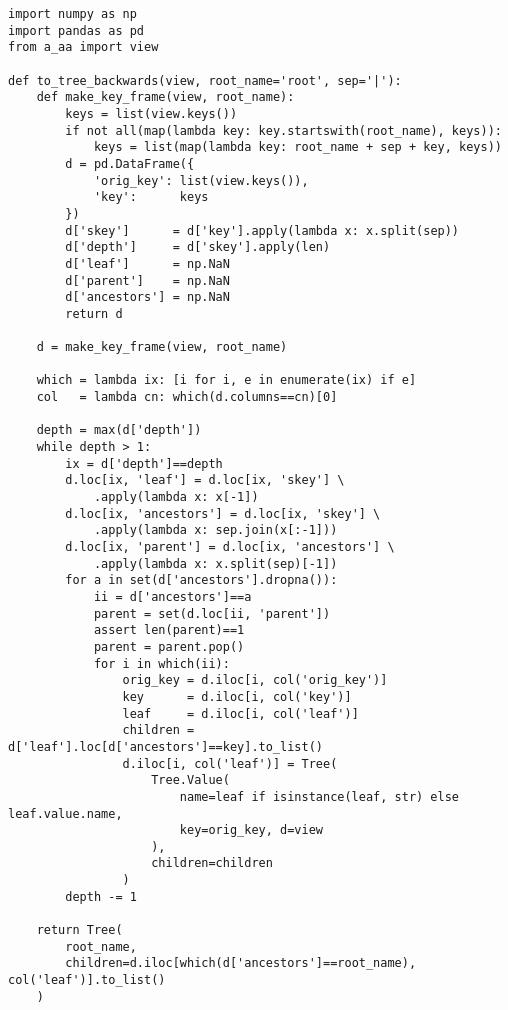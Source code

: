 \documentclass[10pt]{amsart}
\numberwithin{equation}{section}
\begin{document}
\begin{verbatim}
import numpy as np
import pandas as pd
from a_aa import view

def to_tree_backwards(view, root_name='root', sep='|'):
    def make_key_frame(view, root_name):
        keys = list(view.keys())
        if not all(map(lambda key: key.startswith(root_name), keys)):
            keys = list(map(lambda key: root_name + sep + key, keys))
        d = pd.DataFrame({
            'orig_key': list(view.keys()),
            'key':      keys
        })
        d['skey']      = d['key'].apply(lambda x: x.split(sep))
        d['depth']     = d['skey'].apply(len)
        d['leaf']      = np.NaN
        d['parent']    = np.NaN
        d['ancestors'] = np.NaN
        return d

    d = make_key_frame(view, root_name)

    which = lambda ix: [i for i, e in enumerate(ix) if e]
    col   = lambda cn: which(d.columns==cn)[0]

    depth = max(d['depth'])
    while depth > 1:
        ix = d['depth']==depth
        d.loc[ix, 'leaf'] = d.loc[ix, 'skey'] \
            .apply(lambda x: x[-1])
        d.loc[ix, 'ancestors'] = d.loc[ix, 'skey'] \
            .apply(lambda x: sep.join(x[:-1]))
        d.loc[ix, 'parent'] = d.loc[ix, 'ancestors'] \
            .apply(lambda x: x.split(sep)[-1])
        for a in set(d['ancestors'].dropna()):
            ii = d['ancestors']==a
            parent = set(d.loc[ii, 'parent'])
            assert len(parent)==1
            parent = parent.pop()
            for i in which(ii):
                orig_key = d.iloc[i, col('orig_key')] 
                key      = d.iloc[i, col('key')] 
                leaf     = d.iloc[i, col('leaf')]
                children = d['leaf'].loc[d['ancestors']==key].to_list()
                d.iloc[i, col('leaf')] = Tree(
                    Tree.Value( 
                        name=leaf if isinstance(leaf, str) else leaf.value.name, 
                        key=orig_key, d=view
                    ), 
                    children=children
                )
        depth -= 1

    return Tree(
        root_name, 
        children=d.iloc[which(d['ancestors']==root_name), col('leaf')].to_list()
    )
\end{verbatim}

\begin{verbatim}



\end{verbatim}
\end{document}

